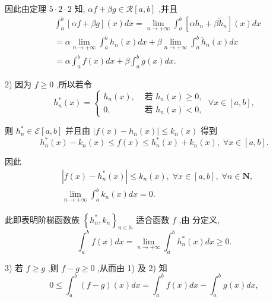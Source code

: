 因此由定理 $5 \cdot  2 \cdot  2$ 知, ${\alpha f} + {\beta g} \in  \mathcal{R}\left\lbrack  {a,b}\right\rbrack$ ,并且
\begin{align*}
	&{\int }_{a}^{b}\left\lbrack  {{\alpha f} + {\beta g}}\right\rbrack  \left( x\right) {dx} = \mathop{\lim }\limits_{{n \rightarrow   + \infty }}{\int }_{a}^{b}\left\lbrack  {\alpha {h}_{n} + \beta {\widetilde{h}}_{n}}\right\rbrack  \left( x\right) {dx}\\
	&= \alpha \mathop{\lim }\limits_{{n \rightarrow   + \infty }}{\int }_{a}^{b}{h}_{n}\left( x\right) {dx} + \beta \mathop{\lim }\limits_{{n \rightarrow   + \infty }}{\int }_{a}^{b}{\widetilde{h}}_{n}\left( x\right) {dx}\\
	&= \alpha {\int }_{a}^{b}f\left( x\right) {dx} + \beta {\int }_{a}^{b}g\left( x\right) {dx}.
\end{align*}

2) 因为 $f \geq  0$ ,所以若令
$${h}_{n}^{ * }\left( x\right)  = \left\{  {\begin{array}{ll} {h}_{n}\left( x\right) , & \text{ 若 }{h}_{n}\left( x\right)  \geq  0, \\  0, & \text{ 若 }{h}_{n}\left( x\right)  < 0, \end{array}\;\forall x \in  \left\lbrack  {a,b}\right\rbrack  ,}\right.$$

则 ${h}_{n}^{ * } \in  \mathcal{E}\left\lbrack  {a,b}\right\rbrack$ 并且由 $\left| {f\left( x\right)  - {h}_{n}\left( x\right) }\right|  \leq  {k}_{n}\left( x\right)$ 得到
$${h}_{n}^{ * }\left( x\right)  - {k}_{n}\left( x\right)  \leq  f\left( x\right)  \leq  {h}_{n}^{ * }\left( x\right)  + {k}_{n}\left( x\right) ,\;\forall x \in  \left\lbrack  {a,b}\right\rbrack  .$$

因此
\begin{align*}
	&\left| {f\left( x\right)  - {h}_{n}^{ * }\left( x\right) }\right|  \leq  {k}_{n}\left( x\right) ,\;\forall x \in  \left\lbrack  {a,b}\right\rbrack  ,\;\forall n \in  \mathbf{N},\\
	&\mathop{\lim }\limits_{{n \rightarrow   + \infty }}{\int }_{a}^{b}{k}_{n}\left( x\right) {dx} = 0.
\end{align*}

此即表明阶梯函数族 ${\left\{  {h}_{n}^{ * },{k}_{n}\right\}  }_{n \in  \mathbb{N}}$ 适合函数 $f$ ,由 分定义,
$${\int }_{a}^{b}f\left( x\right) {dx} = \mathop{\lim }\limits_{{n \rightarrow   + \infty }}{\int }_{a}^{b}{h}_{n}^{ * }\left( x\right) {dx} \geq  0.$$

3) 若 $f \geq  g$ ,则 $f - g \geq  0$ ,从而由 1) 及 2) 知
$$0 \leq  {\int }_{a}^{b}\left( {f - g}\right) \left( x\right) {dx} = {\int }_{a}^{b}f\left( x\right) {dx} - {\int }_{a}^{b}g\left( x\right) {dx},$$

